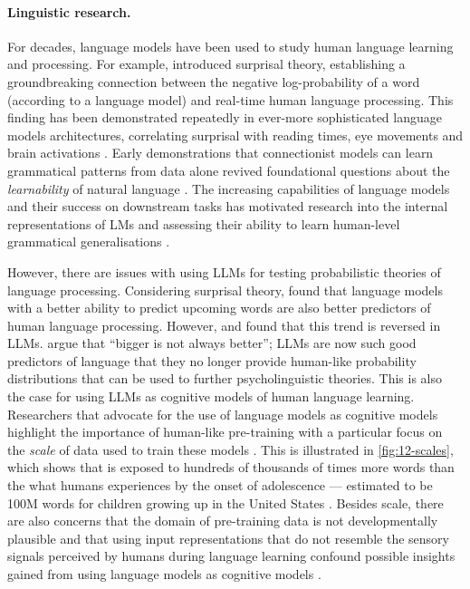 \paragraph{Linguistic research.} For decades, language models have been used to study human language learning and processing. For example, \citet{hale-2001-probabilistic} introduced surprisal theory, establishing a groundbreaking connection between the negative log-probability of a word (according to a language model) and real-time human language processing. This finding has been demonstrated repeatedly in ever-more sophisticated language models architectures, correlating surprisal with reading times, eye movements and brain activations \citep[e.g.][]{levy2008expectation, futrell2019neural, futrell2020lossy, schrimpf2021neural}. Early demonstrations that connectionist models can learn grammatical patterns from data alone \citep[e.g.,][]{elman-1990-finding, macdonald1994lexical} revived foundational questions about the \emph{learnability} of natural language \citep{gold1967language}. The increasing capabilities of language models and their success on downstream tasks has motivated research into the internal representations of LMs and assessing their ability to learn human-level grammatical generalisations \citep{hewitt-manning-2019-structural, hu-etal-2020-systematic, manning-2020-emergent}.

However, there are issues with using LLMs for testing probabilistic theories of language processing. Considering surprisal theory, \citet{wilcox2020predictive} found that language models with a better ability to predict upcoming words are also better predictors of human language processing. However, \citet{shain2024large} and \citet{oh2024frequency} found that this trend is reversed in LLMs. \citet{wilcox2025bigger} argue that ``bigger is not always better''; LLMs are now such good predictors of language that they no longer provide human-like probability distributions that can be used to further psycholinguistic theories. This is also the case for using LLMs as cognitive models of human language learning. Researchers that advocate for the use of language models as cognitive models highlight the importance of human-like pre-training with a particular focus on the \emph{scale} of data used to train these models \citep{linzen-2020-accelerate,baroni-2022-proper,warstadt-2022-artificial,wilcox2025bigger}. This is illustrated in \cref{fig:12-scales}, which shows that  is exposed to hundreds of thousands of times more words than the what humans experiences by the onset of adolescence --- estimated to be 100M words for children growing up in the United States \citep{gilkerson2017mapping}. Besides scale, there are also concerns that the domain of pre-training data is not developmentally plausible \citep{huebner-etal-2021-babyberta, warstadt2023findings} and that using input representations that do not resemble the sensory signals perceived by humans during language learning confound possible insights gained from using language models as cognitive models \citep{dupoux-2018-cognitive}. 

